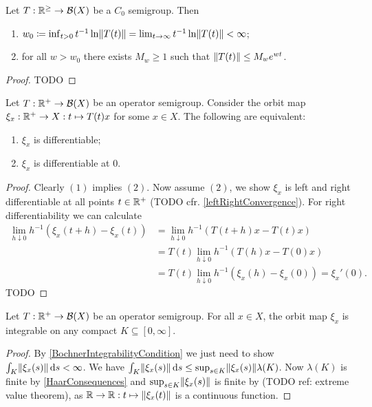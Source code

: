 \begin{proposition}
Let $T: \mathbb{R}^{\geq} \to \operatorname{\mathcal{B}}(X)$ be a $C_0$ semigroup. Then
\begin{enumerate}
\item $w_0 \coloneqq \inf_{t>0}t^{-1}\ln\lVert T(t)\rVert = \lim_{t\to \infty}t^{-1}\ln\lVert T(t)\rVert < \infty$;
\item for all $w > w_0$ there exists $M_w \geq 1$ such that $\lVert T(t)\rVert \leq M_we^{wt}$.
\end{enumerate}
\end{proposition}
\begin{proof}
TODO
\end{proof}

\begin{lemma}
Let $T: \mathbb{R}^+\to \operatorname{\mathcal{B}}(X)$ be an operator semigroup. Consider the orbit map $\xi_x: \mathbb{R}^+ \to X: t\mapsto T(t)x$ for some $x\in X$. The following are equivalent:
\begin{enumerate}
\item $\xi_x$ is differentiable;
\item $\xi_x$ is differentiable at $0$.
\end{enumerate}
\end{lemma}
\begin{proof}
Clearly $(1)$ implies $(2)$. Now assume $(2)$, we show $\xi_x$ is left and right differentiable at all points $t\in\mathbb{R}^+$ (TODO cfr. \ref{leftRightConvergence}). For right differentiability we can calculate
\begin{align*}
\lim_{h\downarrow 0} h^{-1}(\xi_x(t+h) - \xi_x(t)) &= \lim_{h\downarrow 0} h^{-1}(T(t+h)x - T(t)x) \\
&= T(t)\lim_{h\downarrow 0} h^{-1}(T(h)x - T(0)x) \\
&= T(t)\lim_{h\downarrow 0} h^{-1}(\xi_x(h) - \xi_x(0)) = \xi_x'(0).
\end{align*}
TODO
\end{proof}

\begin{lemma} \label{integrabilityOrbitMaps}
Let $T: \mathbb{R}^+\to \operatorname{\mathcal{B}}(X)$ be an operator semigroup. For all $x\in X$, the orbit map $\xi_x$ is integrable on any compact $K\subseteq [0,\infty]$.
\end{lemma}
\begin{proof}
By \ref{BochnerIntegrabilityCondition} we just need to show $\int_K\lVert\xi_x(s)\rVert\operatorname{d \!}{s} < \infty$. We have $\int_K\lVert\xi_x(s)\rVert\operatorname{d \!}{s} \leq \sup_{s\in K}\lVert\xi_x(s)\rVert\lambda(K)$. Now $\lambda(K)$ is finite by \ref{HaarConsequences} and $\sup_{s\in K}\lVert\xi_x(s)\rVert$ is finite by (TODO ref: extreme value theorem), as $\mathbb{R} \to \mathbb{R}: t\mapsto \lVert\xi_x(t)\rVert$ is a continuous function.
\end{proof}

